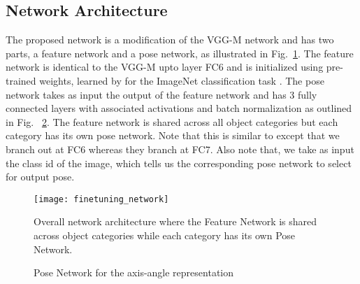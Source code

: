 \documentclass[10pt,twocolumn,letterpaper]{article}
\begin{document}
	\subsection{Network Architecture}
	\label{sec:architecture}

	The proposed network is a modification of the VGG-M network \cite{Chatfield:BMVC14} and has two parts, a feature network and a pose network, as illustrated in Fig.~\ref{fig:overall_network}.
	The feature network is identical to the VGG-M upto layer FC6 and is initialized using pre-trained weights, learned by \cite{Chatfield:BMVC14} for the ImageNet classification task \cite{ImageNet}. The pose network takes as input the output of the feature network and has 3 fully connected layers with associated activations and batch normalization as outlined in Fig. ~\ref{fig:pose_network}. The feature network is shared across all object categories but each category has its own pose network. Note that this is similar to \cite{Tulsiani:CVPR15, Su:ICCV15} except that we branch out at FC6 whereas they branch at FC7. Also note that, we take as input the class id of the image, which tells us the corresponding pose network to select for output pose.
	
	\begin{figure}[h]
		\centering
		\texttt{[image: finetuning\_network]}
		\caption{Overall network architecture where the Feature Network is shared across object 
			categories while each category has its own Pose Network.}
		\label{fig:overall_network}
	\end{figure}

	\begin{figure}[h]
		\small
		\caption{Pose Network for the axis-angle representation}
		\label{fig:pose_network}
	\end{figure}
\end{document}
